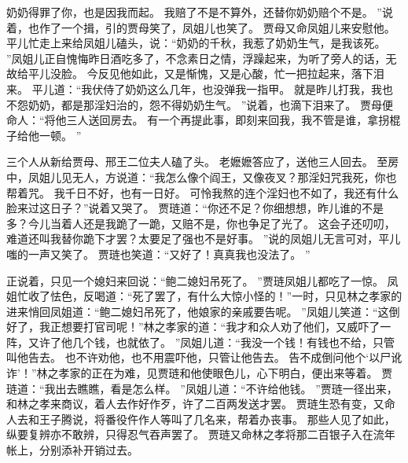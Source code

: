 奶奶得罪了你，也是因我而起。
我赔了不是不算外，还替你奶奶赔个不是。
”说着，也作了一个揖，引的贾母笑了，凤姐儿也笑了。
贾母又命凤姐儿来安慰他。
平儿忙走上来给凤姐儿磕头，说：“奶奶的千秋，我惹了奶奶生气，是我该死。
”凤姐儿正自愧悔昨日酒吃多了，不念素日之情，浮躁起来，为听了旁人的话，无故给平儿没脸。
今反见他如此，又是惭愧，又是心酸，忙一把拉起来，落下泪来。
平儿道：“我伏侍了奶奶这么几年，也没弹我一指甲。
就是昨儿打我，我也不怨奶奶，都是那淫妇治的，怨不得奶奶生气。
”说着，也滴下泪来了。
贾母便命人：“将他三人送回房去。
有一个再提此事，即刻来回我，我不管是谁，拿拐棍子给他一顿。
”\par
三个人从新给贾母、邢王二位夫人磕了头。
老嬷嬷答应了，送他三人回去。
至房中，凤姐儿见无人，方说道：“我怎么像个阎王，又像夜叉？那淫妇咒我死，你也帮着咒。
我千日不好，也有一日好。
可怜我熬的连个淫妇也不如了，我还有什么脸来过这日子？”说着又哭了。
贾琏道：“你还不足？你细想想，昨儿谁的不是多？今儿当着人还是我跪了一跪，又赔不是，你也争足了光了。
这会子还叨叨，难道还叫我替你跪下才罢？太要足了强也不是好事。
”说的凤姐儿无言可对，平儿嗤的一声又笑了。
贾琏也笑道：“又好了！真真我也没法了。
”\par
正说着，只见一个媳妇来回说：“鲍二媳妇吊死了。
”贾琏凤姐儿都吃了一惊。
凤姐忙收了怯色，反喝道：“死了罢了，有什么大惊小怪的！”一时，只见林之孝家的进来悄回凤姐道：“鲍二媳妇吊死了，他娘家的亲戚要告呢。
”凤姐儿笑道：“这倒好了，我正想要打官司呢！”林之孝家的道：“我才和众人劝了他们，又威吓了一阵，又许了他几个钱，也就依了。
”凤姐儿道：“我没一个钱！有钱也不给，只管叫他告去。
也不许劝他，也不用震吓他，只管让他告去。
告不成倒问他个‘以尸讹诈’！”林之孝家的正在为难，见贾琏和他使眼色儿，心下明白，便出来等着。
贾琏道：“我出去瞧瞧，看是怎么样。
”凤姐儿道：“不许给他钱。
”贾琏一径出来，和林之孝来商议，着人去作好作歹，许了二百两发送才罢。
贾琏生恐有变，又命人去和王子腾说，将番役仵作人等叫了几名来，帮着办丧事。
那些人见了如此，纵要复辨亦不敢辨，只得忍气吞声罢了。
贾琏又命林之孝将那二百银子入在流年帐上，分别添补开销过去。
